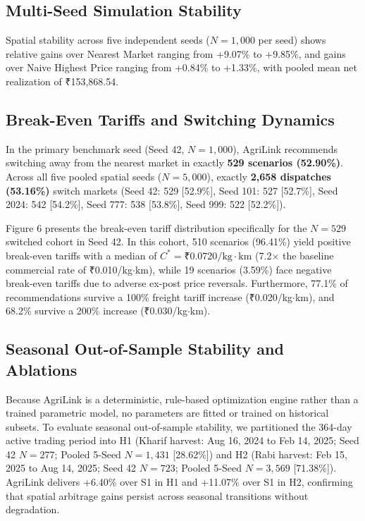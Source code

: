 \documentclass[journal]{IEEEtran}
\begin{document}
\subsection{Multi-Seed Simulation Stability}
Spatial stability across five independent seeds ($N = 1,000$ per seed) shows relative gains over Nearest Market ranging from +9.07\% to +9.85\%, and gains over Naive Highest Price ranging from +0.84\% to +1.33\%, with pooled mean net realization of ₹153,868.54.

\subsection{Break-Even Tariffs and Switching Dynamics}
In the primary benchmark seed (Seed 42, $N = 1,000$), AgriLink recommends switching away from the nearest market in exactly \textbf{529 scenarios (52.90\%)}. Across all five pooled spatial seeds ($N = 5,000$), exactly \textbf{2,658 dispatches (53.16\%)} switch markets (Seed 42: 529 [52.9\%], Seed 101: 527 [52.7\%], Seed 2024: 542 [54.2\%], Seed 777: 538 [53.8\%], Seed 999: 522 [52.2\%]).

Figure 6 presents the break-even tariff distribution specifically for the $N = 529$ switched cohort in Seed 42. In this cohort, 510 scenarios (96.41\%) yield positive break-even tariffs with a median of $C^* = \text{₹}0.0720/\text{kg}\cdot\text{km}$ (7.2$\times$ the baseline commercial rate of ₹0.010/kg$\cdot$km), while 19 scenarios (3.59\%) face negative break-even tariffs due to adverse ex-post price reversals. Furthermore, 77.1\% of recommendations survive a 100\% freight tariff increase (₹0.020/kg$\cdot$km), and 68.2\% survive a 200\% increase (₹0.030/kg$\cdot$km).

\subsection{Seasonal Out-of-Sample Stability and Ablations}
Because AgriLink is a deterministic, rule-based optimization engine rather than a trained parametric model, no parameters are fitted or trained on historical subsets. To evaluate seasonal out-of-sample stability, we partitioned the 364-day active trading period into H1 (Kharif harvest: Aug 16, 2024 to Feb 14, 2025; Seed 42 $N = 277$; Pooled 5-Seed $N = 1,431$ [28.62\%]) and H2 (Rabi harvest: Feb 15, 2025 to Aug 14, 2025; Seed 42 $N = 723$; Pooled 5-Seed $N = 3,569$ [71.38\%]). AgriLink delivers +6.40\% over S1 in H1 and +11.07\% over S1 in H2, confirming that spatial arbitrage gains persist across seasonal transitions without degradation.
\end{document}
